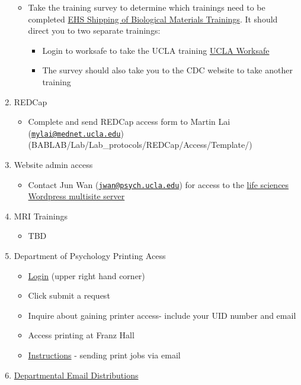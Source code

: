 \documentclass[]{book}
\providecommand{\tightlist}{%
  \setlength{\itemsep}{0pt}\setlength{\parskip}{0pt}}
\begin{document}
\begin{enumerate}
  \begin{itemize}
  \tightlist
  \item
    Take the training survey to determine which trainings need to be completed \href{https://www.ehs.ucla.edu/training-support/courses/biosafety/bioshipping}{EHS Shipping of Biological Materials Trainings}. It should direct you to two separate trainings:

    \begin{itemize}
    \tightlist
    \item
      Login to worksafe to take the UCLA training \href{https://worksafe.ucla.edu/ucla/Programs/Standard/Control/elmLearner.wml}{UCLA Worksafe}
    \item
      The survey should also take you to the CDC website to take another training
    \end{itemize}
  \end{itemize}
\item
  REDCap

  \begin{itemize}
  \tightlist
  \item
    Complete and send REDCap access form to Martin Lai (\href{mailto:mylai@mednet.ucla.edu}{\nolinkurl{mylai@mednet.ucla.edu}}) (BABLAB/Lab/Lab\_protocols/REDCap/Access/Template/)
  \end{itemize}
\item
  Website admin access

  \begin{itemize}
  \tightlist
  \item
    Contact Jun Wan (\href{mailto:jwan@psych.ucla.edu}{\nolinkurl{jwan@psych.ucla.edu}}) for access to the \href{https://sites.lifesci.ucla.edu/}{life sciences Wordpress multisite server}
  \end{itemize}
\item
  MRI Trainings

  \begin{itemize}
  \tightlist
  \item
    TBD
  \end{itemize}
\item
  Department of Psychology Printing Acess

  \begin{itemize}
  \tightlist
  \item
    \href{https://support.lifesci.ucla.edu/hc/en-us}{Login} (upper right hand corner)
  \item
    Click submit a request
  \item
    Inquire about gaining printer access- include your UID number and email
  \item
    Access printing at Franz Hall
  \item
    \href{https://ucla.app.box.com/s/db0zzvgrydw1yz99yo1nlooq1j4n7jos}{Instructions} - sending print jobs via email
  \end{itemize}
\item
  \href{https://ucla.app.box.com/v/Psych-Directory-List}{Departmental Email Distributions}
\end{enumerate}
\end{document}
